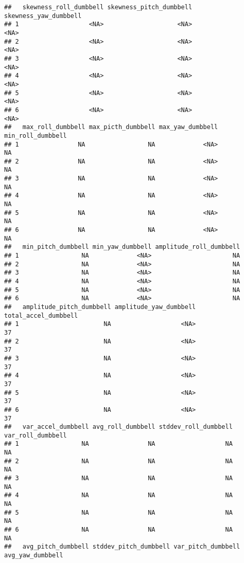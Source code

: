 \documentclass[
]{article}
\begin{document}
\begin{verbatim}
##   skewness_roll_dumbbell skewness_pitch_dumbbell skewness_yaw_dumbbell
## 1                   <NA>                    <NA>                  <NA>
## 2                   <NA>                    <NA>                  <NA>
## 3                   <NA>                    <NA>                  <NA>
## 4                   <NA>                    <NA>                  <NA>
## 5                   <NA>                    <NA>                  <NA>
## 6                   <NA>                    <NA>                  <NA>
##   max_roll_dumbbell max_picth_dumbbell max_yaw_dumbbell min_roll_dumbbell
## 1                NA                 NA             <NA>                NA
## 2                NA                 NA             <NA>                NA
## 3                NA                 NA             <NA>                NA
## 4                NA                 NA             <NA>                NA
## 5                NA                 NA             <NA>                NA
## 6                NA                 NA             <NA>                NA
##   min_pitch_dumbbell min_yaw_dumbbell amplitude_roll_dumbbell
## 1                 NA             <NA>                      NA
## 2                 NA             <NA>                      NA
## 3                 NA             <NA>                      NA
## 4                 NA             <NA>                      NA
## 5                 NA             <NA>                      NA
## 6                 NA             <NA>                      NA
##   amplitude_pitch_dumbbell amplitude_yaw_dumbbell total_accel_dumbbell
## 1                       NA                   <NA>                   37
## 2                       NA                   <NA>                   37
## 3                       NA                   <NA>                   37
## 4                       NA                   <NA>                   37
## 5                       NA                   <NA>                   37
## 6                       NA                   <NA>                   37
##   var_accel_dumbbell avg_roll_dumbbell stddev_roll_dumbbell var_roll_dumbbell
## 1                 NA                NA                   NA                NA
## 2                 NA                NA                   NA                NA
## 3                 NA                NA                   NA                NA
## 4                 NA                NA                   NA                NA
## 5                 NA                NA                   NA                NA
## 6                 NA                NA                   NA                NA
##   avg_pitch_dumbbell stddev_pitch_dumbbell var_pitch_dumbbell avg_yaw_dumbbell

\end{verbatim}
\end{document}
